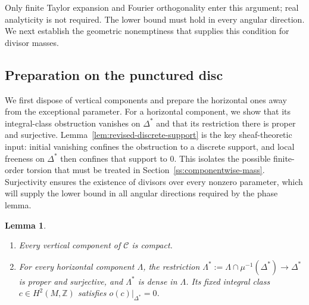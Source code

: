 \documentclass[11pt]{amsart}
\numberwithin{equation}{section}
\theoremstyle{plain}
\newtheorem{lemma}[thm]{Lemma}
\theoremstyle{definition}
\newcommand{\Z}{\mathbb Z}
\begin{document}
Only finite Taylor expansion and Fourier orthogonality enter this
argument; real analyticity is not required.  The lower bound must
hold in every angular direction.  We next establish the geometric
nonemptiness that supplies this condition for divisor masses.

\subsection{Preparation on the punctured disc}
\label{ss:componentwise-punctured}

We first dispose of vertical components and prepare the horizontal
ones away from the exceptional parameter.  For a horizontal component,
we show that its integral-class obstruction vanishes on $\Delta^*$ and
that its restriction there is proper and surjective.
Lemma~\ref{lem:revised-discrete-support} is the key sheaf-theoretic input:
initial vanishing confines the obstruction to a discrete support, and
local freeness on $\Delta^*$ then confines that support to $0$.
This isolates the possible finite-order torsion that must be treated in
Section~\ref{ss:componentwise-mass}.  Surjectivity
ensures the existence of divisors over every nonzero parameter, which
will supply the lower bound in all angular directions required by the
phase lemma.

\begin{lemma}\label{lem:componentwise-punctured}
\begin{enumerate}[$(i)$]
\item Every vertical component of $\mathscr C$ is compact.
\item For every horizontal component $\Lambda$, the restriction
$\Lambda^*:=\Lambda\cap\mu^{-1}(\Delta^*)\to\Delta^*$ is proper and
surjective, and $\Lambda^*$ is dense in $\Lambda$.  Its fixed integral
class $c\in H^2(M,\Z)$ satisfies $o(c)|_{\Delta^*}=0$.
\end{enumerate}
\end{lemma}
\end{document}
